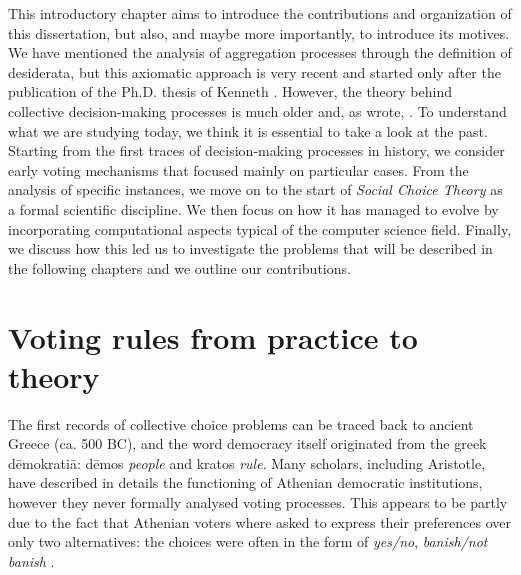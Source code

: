 This introductory chapter aims to introduce the contributions and organization of this dissertation, but also, and maybe more importantly, to introduce its motives.
We have mentioned the analysis of aggregation processes through the definition of desiderata, but this axiomatic approach is very recent and started only after the publication of the Ph.D. thesis of Kenneth \citet{Arrow1951}.
However, the theory behind collective decision-making processes is much older and, as \citet{McLean1990} wrote, . To understand what we are studying today, we think it is essential to take a look at the past.
Starting from the first traces of decision-making processes in history, we consider early voting mechanisms that focused mainly on particular cases.
From the analysis of specific instances, we move on to the start of \textit{Social Choice Theory} as a formal scientific discipline.
We then focus on how it has managed to evolve by incorporating computational aspects typical of the computer science field.
Finally, we discuss how this led us to investigate the problems that will be described in the following chapters and we outline our contributions.

\section{Voting rules from practice to theory}
The first records of collective choice problems can be traced back to ancient Greece (ca. 500 BC), and the word democracy itself originated from the greek dēmokratiā: dēmos \textit{people} and kratos \textit{rule}.
Many scholars, including Aristotle, have described in details the functioning of Athenian democratic institutions, however they never formally analysed voting processes. This appears to be partly due to the fact that Athenian voters where asked to express their preferences over only two alternatives: the choices were often in the form of \textit{yes/no}, \textit{banish/not banish} \citep{McLeanUrken1995}.

